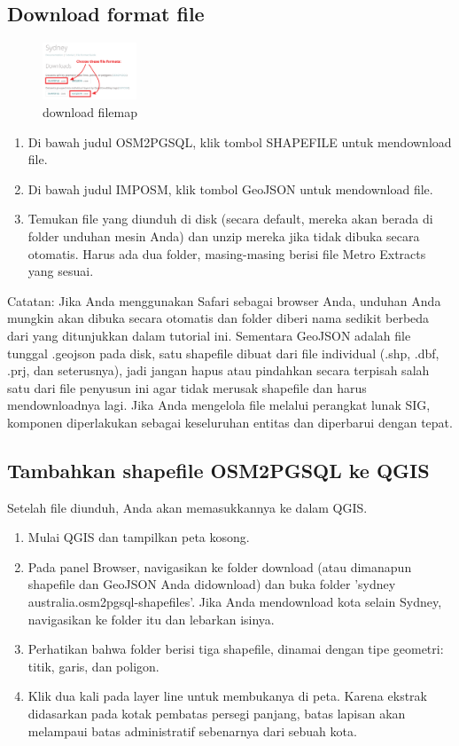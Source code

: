 \subsection{Download format file}

\begin{figure}[ht]
\centerline{\includegraphics[width=0.25\textwidth]{figures/downloadfile}}
\caption{download filemap}
\label {downloadfile}
\end{figure}

\begin{enumerate}
\item
Di bawah judul OSM2PGSQL, klik tombol SHAPEFILE untuk mendownload file.
\item
Di bawah judul IMPOSM, klik tombol GeoJSON untuk mendownload file.
\item
Temukan file yang diunduh di disk (secara default, mereka akan berada di folder unduhan mesin Anda) dan unzip mereka jika tidak dibuka secara otomatis. Harus ada dua folder, masing-masing berisi file Metro Extracts yang sesuai.
\end{enumerate}
Catatan: Jika Anda menggunakan Safari sebagai browser Anda, unduhan Anda mungkin akan dibuka secara otomatis dan folder diberi nama sedikit berbeda dari yang ditunjukkan dalam tutorial ini.
Sementara GeoJSON adalah file tunggal .geojson pada disk, satu shapefile dibuat dari file individual (.shp, .dbf, .prj, dan seterusnya), jadi jangan hapus atau pindahkan secara terpisah salah satu dari file penyusun ini agar tidak merusak shapefile dan harus mendownloadnya lagi. Jika Anda mengelola file melalui perangkat lunak SIG, komponen diperlakukan sebagai keseluruhan entitas dan diperbarui dengan tepat.

\subsection{Tambahkan shapefile OSM2PGSQL ke QGIS}
Setelah file diunduh, Anda akan memasukkannya ke dalam QGIS.
\begin{enumerate}
\item
Mulai QGIS dan tampilkan peta kosong.
\item
Pada panel Browser, navigasikan ke folder download (atau dimanapun shapefile dan GeoJSON Anda didownload) dan buka folder 'sydney australia.osm2pgsql-shapefiles'. Jika Anda mendownload kota selain Sydney, navigasikan ke folder itu dan lebarkan isinya.
\item
Perhatikan bahwa folder berisi tiga shapefile, dinamai dengan tipe geometri: titik, garis, dan poligon.
\item
Klik dua kali pada layer line untuk membukanya di peta. Karena ekstrak didasarkan pada kotak pembatas persegi panjang, batas lapisan akan melampaui batas administratif sebenarnya dari sebuah kota.
\end{enumerate}

